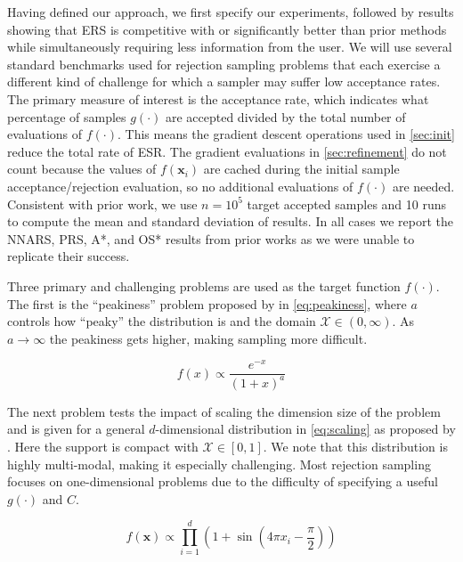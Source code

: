 \documentclass{ecai}  %
\begin{document}
Having defined our approach, we first specify our experiments, followed by results showing that ERS is competitive with or significantly better than prior methods while simultaneously requiring less information from the user. We will use several standard benchmarks used for rejection sampling problems that each exercise a different kind of challenge for which a sampler may suffer low acceptance rates. The primary measure of interest is the acceptance rate, which indicates what percentage of samples $g(\cdot)$ are accepted divided by the total number of evaluations of $f(\cdot)$. This means the gradient descent operations used in \autoref{sec:init} reduce the total rate of ESR. The gradient evaluations in \autoref{sec:refinement} do not count because the values of $f(\bm{x}_i)$ are cached during the initial sample acceptance/rejection evaluation, so no additional evaluations of $f(\cdot)$ are needed. Consistent with prior work, we use $n=10^5$ target accepted samples and 10 runs to compute the mean and standard deviation of results. In all cases we report the NNARS, PRS, A*, and OS* results from prior works as we were unable to replicate their success. 

Three primary and challenging problems are used as the target function $f(\cdot)$. The first is the ``peakiness'' problem proposed by \cite{NIPS2014_309fee4e} in \autoref{eq:peakiness}, where $a$ controls how ``peaky'' the distribution is and the domain $\mathcal{X} \in (0, \infty)$. As $a \to \infty$ the peakiness gets higher, making sampling more difficult. 

\begin{equation} \label{eq:peakiness}
    f(x) \propto \frac{e^{-x}}{(1+x)^{a}}
\end{equation}

The next problem tests the impact of scaling the dimension size of the problem and is given for a general $d$-dimensional distribution in \autoref{eq:scaling} as proposed by \cite{10.5555/3045390.3045614}. Here the support is compact with $\mathcal{X} \in [0, 1]$. We note that this distribution is highly multi-modal, making it especially challenging. Most rejection sampling focuses on one-dimensional problems due to the difficulty of specifying a useful $g(\cdot)$ and $C$. 

\begin{equation} \label{eq:scaling}
f(\bm{x}) \propto \prod_{i=1}^d \left(1+\sin \left(4 \pi x_i -\frac{\pi}{2}\right)\right)
\end{equation}
\end{document}
